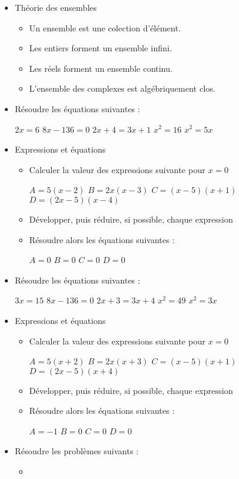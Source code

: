 \begin{itemize}[leftmargin=0.1cm, itemsep=40pt]
\item Théorie des ensembles
	\begin{itemize}[leftmargin=1cm, itemsep=5pt]
	\item Un ensemble est une colection d'élément.
	\item Les entiers forment un ensemble infini.
	\item Les réels forment un ensemble continu.
	\item L'ensemble des complexes est algébriquement clos.
	\end{itemize}



\item Résoudre les équations suivantes :

\hfill $2x = 6$ \hfill $8x - 136 = 0$  \hfill $2x + 4 = 3x + 1$
  \hfill $x^2 = 16$   \hfill $x^2 = 5x$  %

\item Expressions et équations
	\begin{itemize}[leftmargin=1cm, itemsep=5pt]
	\item Calculer la valeur des expressions suivante pour $x=0$
		
		\hfill $ A=5(x-2) $ \hfill $ B=2x(x-3) $ \hfill $ C=(x-5)(x+1) $ \hfill $ D=(2x-5)(x-4) $
	\item Développer, puis réduire, si possible, chaque expression
	\item Résoudre alors les équations suivantes :

		\hfill $ A=0 $ \hfill $ B=0 $ \hfill $ C=0 $ \hfill $ D=0 $
	\end{itemize}


\item Résoudre les équations suivantes :

\hfill $3x = 15$ \hfill $8x - 136 = 0$  \hfill $2x + 3 = 3x + 4$
  \hfill $x^2 = 49$   \hfill $x^2 = 3x$  %

\item Expressions et équations
	\begin{itemize}[leftmargin=1cm, itemsep=5pt]
	\item Calculer la valeur des expressions suivante pour $x=0$
		
		\hfill $ A=5(x+2) $ \hfill $ B=2x(x+3) $ \hfill $ C=(x-5)(x+1) $ \hfill $ D=(2x-5)(x+4) $
	\item Développer, puis réduire, si possible, chaque expression
	\item Résoudre alors les équations suivantes :

		\hfill $ A=-1 $ \hfill $ B=0 $ \hfill $ C=0 $ \hfill $ D=0 $
	\end{itemize}


\item Résoudre les problèmes suivants :
	\begin{itemize}[leftmargin=1cm, itemsep=1pt]
		\item 
	\end{itemize}

	\end{itemize}
